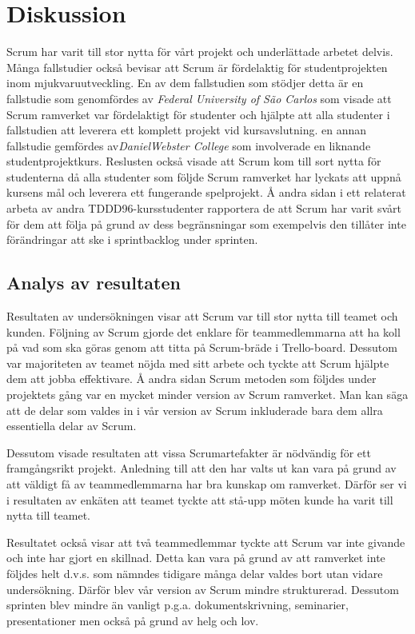 
\section{Diskussion}
\label{sec:Lieth_Wahid-discussion}
Scrum har varit till stor nytta för vårt projekt och underlättade arbetet delvis. Många fallstudier också bevisar att Scrum är fördelaktig för studentprojekten inom mjukvaruutveckling. En av dem fallstudien som stödjer detta är
en fallstudie som genomfördes av \textit{Federal University of São Carlos} som visade att Scrum ramverket var fördelaktigt för studenter och hjälpte att alla studenter i fallstudien att leverera ett komplett projekt vid kursavslutning. en annan fallstudie gemfördes av\textit{DanielWebster College} som involverade en liknande studentprojektkurs.\cite{GameDesign} Reslusten också visade att Scrum kom till sort nytta för studenterna då alla studenter som följde Scrum ramverket har lyckats att uppnå kursens mål och leverera ett fungerande spelprojekt. Å andra sidan i ett relaterat arbeta av andra TDDD96-kursstudenter rapportera de att Scrum har varit svårt för dem att följa på grund av dess begränsningar som exempelvis den tillåter inte förändringar att ske i sprintbacklog under sprinten.\cite{overvakn73:online}


\subsection{Analys av resultaten}
Resultaten av undersökningen visar att Scrum var till stor nytta till teamet och kunden. Följning av Scrum gjorde det enklare för teammedlemmarna att ha koll på vad som ska göras genom att titta på Scrum-bräde i Trello-board. Dessutom var majoriteten av teamet nöjda med sitt arbete och tyckte att Scrum hjälpte dem att jobba effektivare. Å andra sidan Scrum metoden som följdes under projektets gång var en mycket minder version av Scrum ramverket. Man kan säga att de delar som valdes in i vår version av Scrum inkluderade bara dem allra essentiella delar av Scrum.

Dessutom visade resultaten att vissa Scrumartefakter är nödvändig för ett framgångsrikt projekt. Anledning till att den har valts ut kan vara på grund av att väldigt få av teammedlemmarna har bra kunskap om ramverket. Därför ser vi i resultaten av enkäten att teamet tyckte att stå-upp möten kunde ha varit till nytta till teamet. 

Resultatet också visar att två teammedlemmar tyckte att Scrum var inte givande och inte har gjort en skillnad. Detta kan vara på grund av att ramverket inte följdes helt d.v.s. som nämndes tidigare många delar valdes bort utan vidare undersökning. Därför blev vår version av Scrum mindre strukturerad. Dessutom sprinten blev mindre än vanligt p.g.a. dokumentskrivning, seminarier, presentationer men också på grund av helg och lov.
